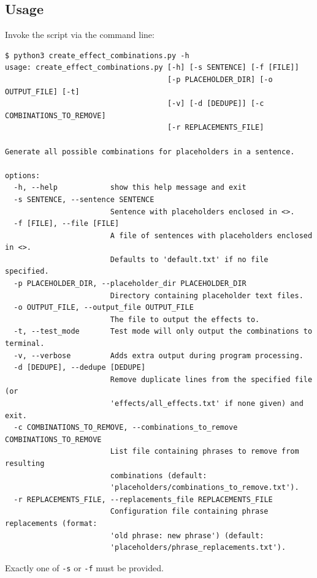 \subsection{Usage}
Invoke the script via the command line:
\begin{lstlisting}[style=terminalstyle]
$ python3 create_effect_combinations.py -h
usage: create_effect_combinations.py [-h] [-s SENTENCE] [-f [FILE]]
                                     [-p PLACEHOLDER_DIR] [-o OUTPUT_FILE] [-t]
                                     [-v] [-d [DEDUPE]] [-c COMBINATIONS_TO_REMOVE]
                                     [-r REPLACEMENTS_FILE]

Generate all possible combinations for placeholders in a sentence.

options:
  -h, --help            show this help message and exit
  -s SENTENCE, --sentence SENTENCE
                        Sentence with placeholders enclosed in <>.
  -f [FILE], --file [FILE]
                        A file of sentences with placeholders enclosed in <>.
                        Defaults to 'default.txt' if no file specified.
  -p PLACEHOLDER_DIR, --placeholder_dir PLACEHOLDER_DIR
                        Directory containing placeholder text files.
  -o OUTPUT_FILE, --output_file OUTPUT_FILE
                        The file to output the effects to.
  -t, --test_mode       Test mode will only output the combinations to terminal.
  -v, --verbose         Adds extra output during program processing.
  -d [DEDUPE], --dedupe [DEDUPE]
                        Remove duplicate lines from the specified file (or
                        'effects/all_effects.txt' if none given) and exit.
  -c COMBINATIONS_TO_REMOVE, --combinations_to_remove COMBINATIONS_TO_REMOVE
                        List file containing phrases to remove from resulting
                        combinations (default:
                        'placeholders/combinations_to_remove.txt').
  -r REPLACEMENTS_FILE, --replacements_file REPLACEMENTS_FILE
                        Configuration file containing phrase replacements (format:
                        'old phrase: new phrase') (default:
                        'placeholders/phrase_replacements.txt').

\end{lstlisting}
Exactly one of \texttt{-s} or \texttt{-f} must be provided.


